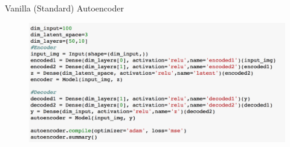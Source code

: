 \documentclass[handout,xcolor=pdftex,dvipsnames,table,mathserif]{beamer}
\begin{document}
\begin{frame}{Vanilla (Standard) Autoencoder}
\begin{figure}
\includegraphics[width=\columnwidth]{../graphics/StandardAutoencoder}
\end{figure}
\end{frame}

\end{document}
